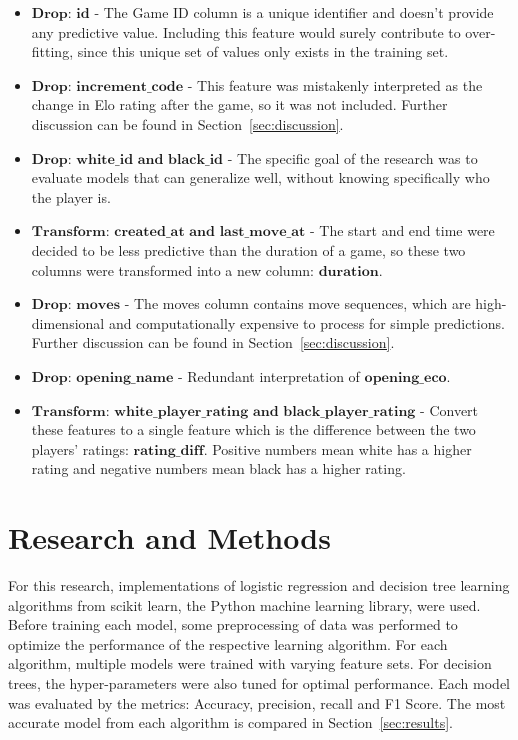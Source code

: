 \documentclass[12pt]{article}
\begin{document}
\begin{itemize}[label={}, leftmargin=0pt]
  \item $\textbf{Drop: id}$ - The Game ID column is a unique identifier and doesn’t provide any predictive value. Including this feature would surely contribute to over-fitting, since this unique set of values only exists in the training set.
  \item $\textbf{Drop: increment\_code}$ - This feature was mistakenly interpreted as the change in Elo rating after the game, so it was not included. Further discussion can be found in Section~\ref{sec:discussion}.
  \item $\textbf{Drop: white\_id and black\_id}$ - The specific goal of the research was to evaluate models that can generalize well, without knowing specifically who the player is.
  \item $\textbf{Transform: created\_at and last\_move\_at}$ - The start and end time were decided to be less predictive than the duration of a game, so these two columns were transformed into a new column: $\textbf{duration}$.
  \item $\textbf{Drop: moves}$ - The moves column contains move sequences, which are high-dimensional and computationally expensive to process for simple predictions. Further discussion can be found in Section~\ref{sec:discussion}.
  \item $\textbf{Drop: opening\_name}$ - Redundant interpretation of $\textbf{opening\_eco}$.
  \item $\textbf{Transform: white\_player\_rating and black\_player\_rating}$ - Convert these features to a single feature which is the difference between the two players' ratings: $\textbf{rating\_diff}$. Positive numbers mean white has a higher rating and negative numbers mean black has a higher rating.
\end{itemize}

\section{Research and Methods}
\label{sec:methods}
For this research, implementations of logistic regression and decision tree learning algorithms from scikit learn, the Python machine learning library, were used. Before training each model, some preprocessing of data was performed to optimize the performance of the respective learning algorithm. For each algorithm, multiple models were trained with varying feature sets. For decision trees, the hyper-parameters were also tuned for optimal performance. Each model was evaluated by the metrics: Accuracy, precision, recall and F1 Score. The most accurate model from each algorithm is compared in Section~\ref{sec:results}.
\end{document}
